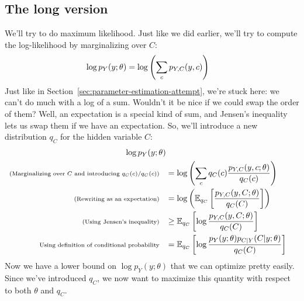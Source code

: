\documentclass[12pt]{article}
\begin{document}
    \subsection{The long version}
    \label{sec:em-long}
    We'll try to do maximum likelihood. Just like we did earlier, we'll try to
    compute the log-likelihood by marginalizing over $C$:
    \begin{align}
        \notag \log p_Y(y; \theta) 
        &= \log\left(\sum_c p_{Y,C}(y,c)\right)
    \end{align}
    Just like in Section~\ref{sec:parameter-estimation-attempt}, we're stuck
    here: we can't do much with a log of a sum.  Wouldn't it be nice if we
    could swap the order of them? Well, an expectation is a special kind of
    sum, and Jensen's inequality lets us swap them if we have an expectation.
    So, we'll introduce a new distribution $q_C$ for the hidden variable $C$:
    \begin{align}
        \log p_Y(y; \theta) \\
        \notag \scriptsize{\text{(Marginalizing over $C$ and introducing $q_C(c)/q_C(c)$)}}\quad
            &= \log\left(\sum_c q_C(c) \frac{p_{Y,C}(y,c; \theta)}{q_C(c)}\right) \\
        \notag \scriptsize{\text{(Rewriting as an expectation)}}\quad
            &= \log\left(\mathbb{E}_{q_C}\left[\frac{p_{Y,C}(y,C; \theta)}{q_C(C)}\right]\right) \\
        \label{eq:em-core-theta} \scriptsize{\text{(Using Jensen's inequality)}}\quad &\geq \mathbb{E}_{q_C}\left[\log \frac{p_{Y,C}(y,C; \theta)}{q_C(C)} \right] \\
        \label{eq:em-core-q} \scriptsize{\text{Using definition of conditional probability}}\quad &= \mathbb{E}_{q_C}\left[\log \frac{p_{Y}(y; \theta)p_{C|Y}(C|y; \theta)}{q_C(C)} \right]
    \end{align}
    Now we have a lower bound on $\log p_Y(y; \theta)$ that we can optimize
    pretty easily. Since we've introduced $q_C$, we now want to maximize
    this quantity with respect to both $\theta$ and $q_C$.
\end{document}
